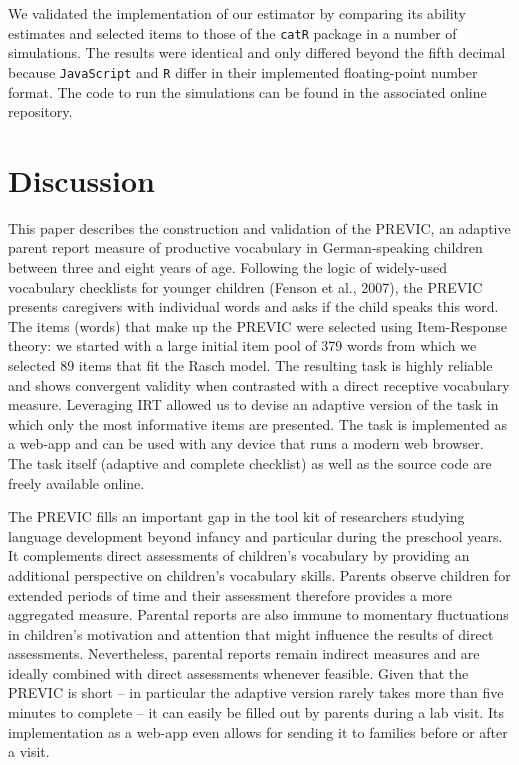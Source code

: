 \documentclass[
  man,floatsintext]{apa6}
\begin{document}
We validated the implementation of our estimator by comparing its ability estimates and selected items to those of the \texttt{catR} package in a number of simulations. The results were identical and only differed beyond the fifth decimal because \texttt{JavaScript} and \texttt{R} differ in their implemented floating-point number format. The code to run the simulations can be found in the associated online repository.

\hypertarget{discussion}{%
\section{Discussion}\label{discussion}}

This paper describes the construction and validation of the PREVIC, an adaptive parent report measure of productive vocabulary in German-speaking children between three and eight years of age. Following the logic of widely-used vocabulary checklists for younger children (Fenson et al., 2007), the PREVIC presents caregivers with individual words and asks if the child speaks this word. The items (words) that make up the PREVIC were selected using Item-Response theory: we started with a large initial item pool of 379 words from which we selected 89 items that fit the Rasch model. The resulting task is highly reliable and shows convergent validity when contrasted with a direct receptive vocabulary measure. Leveraging IRT allowed us to devise an adaptive version of the task in which only the most informative items are presented. The task is implemented as a web-app and can be used with any device that runs a modern web browser. The task itself (adaptive and complete checklist) as well as the source code are freely available online.

The PREVIC fills an important gap in the tool kit of researchers studying language development beyond infancy and particular during the preschool years. It complements direct assessments of children's vocabulary by providing an additional perspective on children's vocabulary skills. Parents observe children for extended periods of time and their assessment therefore provides a more aggregated measure. Parental reports are also immune to momentary fluctuations in children's motivation and attention that might influence the results of direct assessments. Nevertheless, parental reports remain indirect measures and are ideally combined with direct assessments whenever feasible. Given that the PREVIC is short -- in particular the adaptive version rarely takes more than five minutes to complete -- it can easily be filled out by parents during a lab visit. Its implementation as a web-app even allows for sending it to families before or after a visit.
\end{document}
